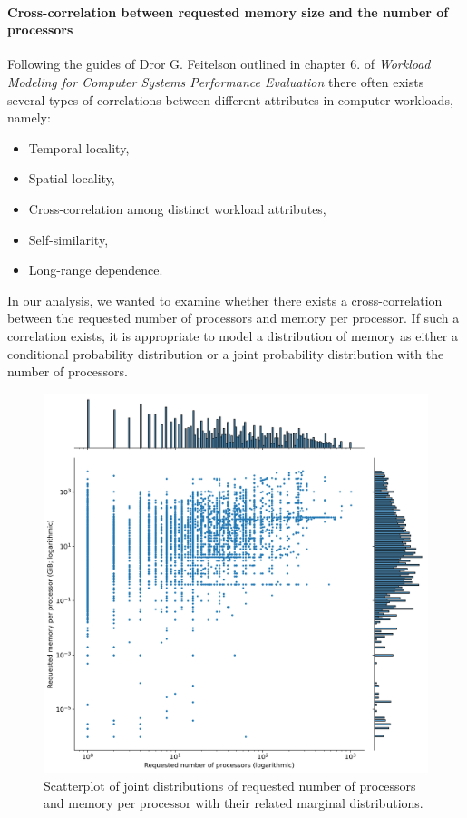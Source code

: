 \documentclass[thesis-en.tex]{subfiles}
\begin{document}
\paragraph{Cross-correlation between requested memory size and the number of processors}
Following the guides of Dror G. Feitelson outlined in chapter 6. of \textit{Workload Modeling for Computer Systems Performance Evaluation} \cite{10.5555/2808941} there often exists several types of correlations between different attributes in computer workloads, namely:
\begin{itemize}
\item Temporal locality,
\item Spatial locality,
\item Cross-correlation among distinct workload attributes,
\item Self-similarity,
\item Long-range dependence.
\end{itemize}
In our analysis, we wanted to examine whether there exists a cross-correlation between the requested number of processors and memory per processor. If such a correlation exists, it is appropriate to model a distribution of memory as either a conditional probability distribution or a joint probability distribution with the number of processors.

\begin{figure}[htb!]
    \includegraphics[width=\textwidth]{images/scatterplot.png}
    \caption{Scatterplot of joint distributions of requested number of processors and memory per processor with their related marginal distributions.}
    \label{fig:scatter}
\end{figure}
\end{document}
